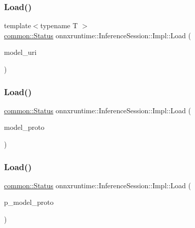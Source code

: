 \subsubsection{\texorpdfstring{Load()}{Load()}\hspace{0.1cm}{\footnotesize\ttfamily [1/4]}}
{\footnotesize\ttfamily template$<$typename T $>$ \\
\mbox{\hyperlink{classonnxruntime_1_1common_1_1Status}{common\+::\+Status}} onnxruntime\+::\+Inference\+Session\+::\+Impl\+::\+Load (\begin{DoxyParamCaption}\item[{const T \&}]{model\+\_\+uri }\end{DoxyParamCaption})\hspace{0.3cm}{\ttfamily [inline]}}

\mbox{\label{classonnxruntime_1_1InferenceSession_1_1Impl_ac3b5439b50b8f9a67c792e4f43eeba9a}} 
\subsubsection{\texorpdfstring{Load()}{Load()}\hspace{0.1cm}{\footnotesize\ttfamily [2/4]}}
{\footnotesize\ttfamily \mbox{\hyperlink{classonnxruntime_1_1common_1_1Status}{common\+::\+Status}} onnxruntime\+::\+Inference\+Session\+::\+Impl\+::\+Load (\begin{DoxyParamCaption}\item[{const Model\+Proto \&}]{model\+\_\+proto }\end{DoxyParamCaption})\hspace{0.3cm}{\ttfamily [inline]}}

\mbox{\label{classonnxruntime_1_1InferenceSession_1_1Impl_ae5261dacd059d34dd6cf6c9d9580573a}} 
\subsubsection{\texorpdfstring{Load()}{Load()}\hspace{0.1cm}{\footnotesize\ttfamily [3/4]}}
{\footnotesize\ttfamily \mbox{\hyperlink{classonnxruntime_1_1common_1_1Status}{common\+::\+Status}} onnxruntime\+::\+Inference\+Session\+::\+Impl\+::\+Load (\begin{DoxyParamCaption}\item[{std\+::unique\+\_\+ptr$<$ Model\+Proto $>$}]{p\+\_\+model\+\_\+proto }\end{DoxyParamCaption})\hspace{0.3cm}{\ttfamily [inline]}}


